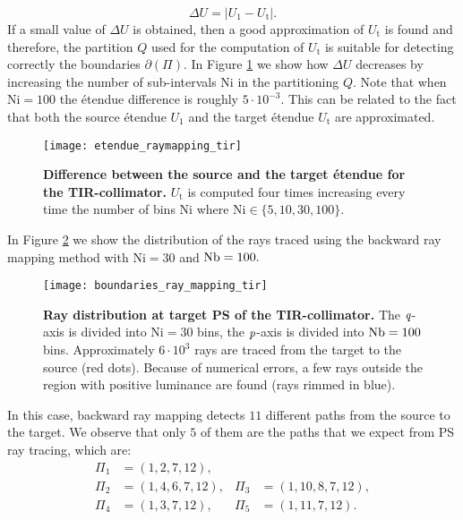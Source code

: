 \begin{equation}\label{eq:delta_raymapping}
\Delta U =  \big|U_1-U_{\textrm{t}}\big|.
\end{equation}
If a small value of $\Delta U$ is obtained, then a good approximation of $U_{\textrm{t}}$ is found and therefore, the partition $Q$ used for the computation of $U_{\textrm{t}}$ is suitable for detecting correctly the boundaries $\partial$$(\Pi)$. In Figure \ref{fig:etendue_raymapping_tir} we show how $\Delta U$ decreases by increasing the number of sub-intervals $\textrm{Ni}$ in the partitioning $Q$. Note that when $\textrm{Ni}=100$ the \'{e}tendue difference is roughly $5\cdot 10^{-3}$. This can be related to the fact that both the source \'{e}tendue $U_1$ and the target \'{e}tendue $U_{\textrm{t}}$ are approximated.
\begin{figure}[h]
  \begin{center}
  \texttt{[image: etendue\_raymapping\_tir]}
  \end{center}
  \caption{\textbf{Difference between the source and the target \'{e}tendue for the TIR-collimator.} $U_{\textrm{t}}$ is computed four times increasing every time the number of bins $\textrm{Ni}$ where $\textrm{Ni}\in\{5,10,30,100\}$. }
\label{fig:etendue_raymapping_tir}
 \end{figure}
In Figure \ref{fig:boundaries_TIR_ray_mapping} we show the distribution of the rays traced using the backward ray mapping method with $\textrm{Ni}=30$ and $\textrm{Nb} = 100.$ 
\begin{figure}[h]
  \begin{center}
  \texttt{[image: boundaries\_ray\_mapping\_tir]}
  \end{center}
  \caption{\textbf{Ray distribution at target PS of the TIR-collimator.}
 The $\textit{q}$-axis is divided into $\textrm{Ni}=30$ bins, the $\textit{p}$-axis is divided into $\textrm{Nb} = 100$ bins. Approximately $6\cdot10^3$ rays are traced from the target to the source (red dots). Because of numerical errors, a few rays outside the region with positive luminance are found (rays rimmed in blue).}
\label{fig:boundaries_TIR_ray_mapping}
 \end{figure}
In this case, backward ray mapping detects $11$ different paths from the source to the target. 
We observe that only $5$ of them are the paths that we expect from PS ray tracing, which are:
\begin{equation}\label{eq:paths_tir}
\begin{array}{llll}
\Pi_1&=(1,2,7,12), \\
\Pi_2&=(1,4,6,7,12), & \Pi_3&=(1,10,8,7,12),\\
\Pi_4&=(1,3,7,12), & \Pi_5&=(1,11,7,12).
\end{array}\end{equation}
